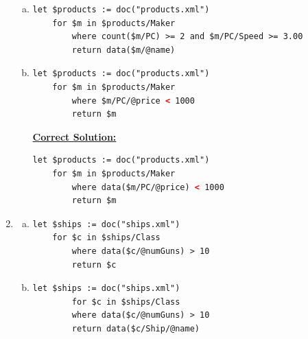 \documentclass[12pt]{article}
\begin{document}
\begin{enumerate}[1.]
\begin{enumerate}[a)]
        \item

    \begin{lstlisting}[language=XML]
    let $products := doc("products.xml")
    for $m in $products/Maker
        where count($m/PC) >= 2 and $m/PC/Speed >= 3.00
        return data($m/@name)
    \end{lstlisting}

        \item

    \begin{lstlisting}[language=XML]
    let $products := doc("products.xml")
    for $m in $products/Maker
        where $m/PC/@price < 1000
        return $m
    \end{lstlisting}

        \bigskip

        \begin{mdframed}
            \underline{\textbf{Correct Solution:}}

    \begin{lstlisting}[language=XML]
    let $products := doc("products.xml")
    for $m in $products/Maker
        where data($m/PC/@price) < 1000
        return $m
    \end{lstlisting}

        \end{mdframed}

    \end{enumerate}

    \item

    \begin{enumerate}[a)]
        \item

    \begin{lstlisting}[language=XML]
    let $ships := doc("ships.xml")
    for $c in $ships/Class
        where data($c/@numGuns) > 10
        return $c
    \end{lstlisting}
        \item

    \begin{lstlisting}[language=XML]
    let $ships := doc("ships.xml")
        for $c in $ships/Class
        where data($c/@numGuns) > 10
        return data($c/Ship/@name)
    \end{lstlisting}
    \end{enumerate}
\end{enumerate}
\end{document}
